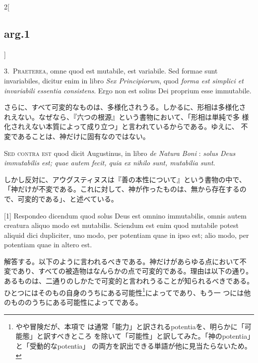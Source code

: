 \documentclass[paper=a4paper,fontsize=10pt,jafontsize=9pt,titlepage]{jlreq}
\begin{document}
\begin{paracol}{2}[\subsection{arg.1}]

3.~{\scshape Praeterea}, omne quod est mutabile, est variabile. Sed
formae sunt invariabiles, dicitur enim in libro {\itshape Sex
Principiorum}, quod {\itshape forma est simplici et invariabili
essentia consistens}. Ergo non est solius Dei proprium esse
immutabile.

\switchcolumn

さらに、すべて可変的なものは、多様化されうる。しかるに、形相は多様化さ
れえない。なぜなら、『六つの根源』という書物において、「形相は単純で多
様化されえない本質によって成り立つ」と言われているからである。ゆえに、
不変であることは、神だけに固有なのではない。

\switchcolumn*[\subsection{s.c.}]

{\scshape Sed contra est} quod dicit Augustinus, in libro {\itshape de
Natura Boni} : {\itshape solus Deus immutabilis est; quae autem fecit,
quia ex nihilo sunt, mutabilia sunt}.

\switchcolumn

しかし反対に、アウグスティヌスは『善の本性について』という書物の中で、
「神だけが不変である。これに対して、神が作ったものは、無から存在するの
で、可変的である」、と述べている。

\switchcolumn*

[1] Respondeo dicendum quod solus Deus est omnino immutabilis, omnis
 autem creatura aliquo modo est mutabilis.  Sciendum est enim quod
 mutabile potest aliquid dici dupliciter, uno modo, per potentiam quae
 in ipso est; alio modo, per potentiam quae in altero est.

\switchcolumn

解答する。以下のように言われるべきである。神だけがあらゆる点において不
変であり、すべての被造物はなんらかの点で可変的である。理由は以下の通り。
あるものは、二通りのしかたで可変的と言われうることが知られるべきである。
ひとつにはそのもの自身のうちにある可能性\footnote{やや冒険だが、本項で
は通常「能力」と訳されるpotentiaを、明らかに「可能態」と訳すべきところ
を除いて「可能性」と訳してみた。「神のpotentia」と「受動的なpotentia」
の両方を訳出できる単語が他に見当たらないため。}によってであり、もう一
つには他のもののうちにある可能性によってである。


\end{paracol}
\end{document}
